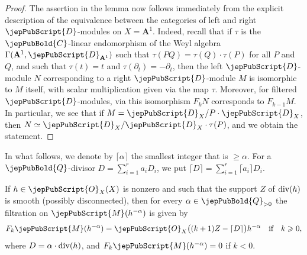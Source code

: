 \begin{proof}
The assertion in the lemma now follows immediately from the explicit description
of the equivalence between the categories of left and right $\jepPubScript{D}$-modules on $X={\mathbf A}^1$. 
Indeed, recall that if $\tau$ is the $\jepPubBold{C}$-linear endomorphism of the Weyl algebra 
$\Gamma({\mathbf A}^1,\jepPubScript{D}_{{\mathbf A}^1})$
such that $\tau(PQ)=\tau(Q)\cdot\tau(P)$ for all $P$ and $Q$, and such that $\tau(t)=t$ and $\tau(\partial_t)=-\partial_t$, then the left
$\jepPubScript{D}$-module $N$ corresponding to a right $\jepPubScript{D}$-module $M$ is isomorphic to $M$ itself, with scalar multiplication given via the map $\tau$.
Moreover, for filtered $\jepPubScript{D}$-modules, via this isomorphism $F_kN$ corresponds to $F_{k-1}M$.
In particular, we see that if $M=\jepPubScript{D}_X/P\cdot\jepPubScript{D}_X$, then $N\simeq \jepPubScript{D}_X/\jepPubScript{D}_X\cdot \tau(P)$, and we obtain the statement.
\end{proof}

In what follows, we denote by $\lceil\alpha\rceil$ the smallest integer that is $\geqslant\alpha$. For a $\jepPubBold{Q}$-divisor $D=\sum_{i=1}^ra_iD_i$,
we put $\lceil D\rceil=\sum_{i=1}^r\lceil a_i\rceil D_i$. 

\begin{corollary}\label{smooth_case}
If $h\in \jepPubScript{O}_X(X)$ is nonzero and such that the support $Z$ of ${\rm div}(h)$ is smooth (possibly disconnected), then
for every $\alpha\in\jepPubBold{Q}_{> 0}$ the filtration on 
$\jepPubScript{M}(h^{- \alpha})$ is given by
$$F_k\jepPubScript{M}(h^{-\alpha})=\jepPubScript{O}_X\big((k+1)Z-\lceil D\rceil\big)h^{-\alpha}\quad \text{if}\quad k\geqslant 0,$$
where $D=\alpha\cdot{\rm div}(h)$, 
and $F_k\jepPubScript{M}(h^{-\alpha})=0$ if $k<0$.
\end{corollary}

